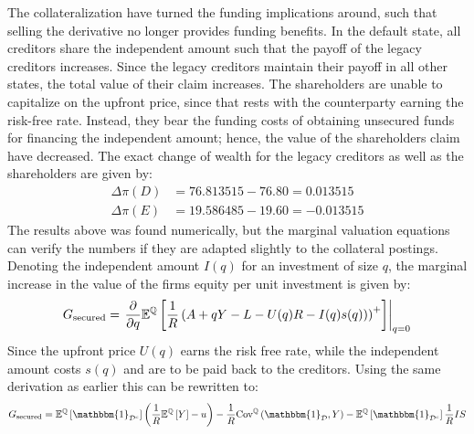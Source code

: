 \documentclass[../main.tex]{subfiles}
\begin{document}
        The collateralization have turned the funding implications around,
        such that selling the derivative no longer provides funding benefits.
        In the default state, all creditors share the independent amount 
        such that the payoff of the legacy creditors increases. 
        Since the legacy creditors maintain their payoff in all other states,
        the total value of their claim increases.
        The shareholders are unable to capitalize on the upfront price,
        since that rests with the counterparty earning the risk-free rate.
        Instead, they bear the funding costs of obtaining unsecured funds 
        for financing the independent amount;
        hence, the value of the shareholders claim have decreased.
        The exact change of wealth for the legacy creditors as well as the shareholders are given by:
        \begin{align}
            \Delta \pi(D) &= \num{76.813515} - \num{76.80} = \num{0.013515}\\
            \Delta \pi(E) &= \num{19.586485} - \num{19.60} = \num{-0.013515}
        \end{align}
        The results above was found numerically, 
        but the marginal valuation equations can verify the numbers 
        if they are adapted slightly to the collateral postings.
        Denoting the independent amount $I(q)$ for an investment of size $q$,
        the marginal increase in the value of the firms equity per unit investment is given by:
            \begin{equation*}
                G_{\text{secured}} = 
                    \left.
                    \frac{
                        \partial 
                    }{
                        \partial 
                        q
                    }
                    \mathbb{E}^{\mathbb{Q}}\left[
                        \frac{1}{R} 
                        \left(
                            A + qY - L - U(q)R - I(q) s(q))
                        \right)^{+}
                    \right] 
                    \right\rvert_{q=0} 
                    \nonumber
            \end{equation*}
        Since the upfront price $U(q)$ earns the risk free rate,
        while the independent amount costs $s(q)$ and are to be paid back to the creditors.
        Using the same derivation as earlier this can be rewritten to:
            \begin{equation}
                G_{\text{secured}} 
                =
                    \mathbb{E}^{\mathbb{Q}}\left[\mathbbm{1}_{\mathcal{D}^{c}}\right] 
                    \left(
                        \discountfactor
                        \mathbb{E}^{\mathbb{Q}}\left[Y\right] 
                        - u
                    \right)
                    -
                    \discountfactor
                    \text{Cov}^{\mathbb{Q}}\left(\mathbbm{1}_{\mathcal{D}}, Y\right) 
                    - 
                    \mathbb{E}^{\mathbb{Q}}\left[
                        \mathbbm{1}_{\mathcal{D}^{c}}
                    \right] \discountfactor I S
                \label{eqn:marginal-shareholder-value-debt-financing-collateral}
            \end{equation}
\end{document}
